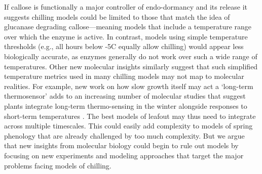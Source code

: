 \documentclass[11pt]{article}
\begin{document}
If callose is functionally a major controller of endo-dormancy and its release it suggests chilling models could be limited to those that match the idea of glucanase degrading callose---meaning models that include a temperature range over which the enzyme is active. In contrast, models using simple temperature thresholds (e.g., all hours below -5\degree C equally allow chilling) would appear less biologically accurate, as enzymes generally do not work over such a wide range of temperatures. Other new molecular insights similarly suggest that such simplified temperature metrics used in many chilling models may not map to molecular realities. For example, new work on how slow growth itself may act  a `long-term thermosensor' \citep{zhao2020temperature} adds to an increasing number of molecular studies that suggest plants integrate long-term thermo-sensing in the winter alongside responses to short-term temperatures \citep{antoniou2021feeling,Satake2022}. The best models of leafout may thus need to integrate across multiple timescales. This could easily add complexity to models of spring phenology that are already challenged by too much complexity. But we argue that new insights from molecular biology could begin to rule out models by focusing on new experiments and modeling approaches that target the major problems facing models of chilling. %


\end{document}
